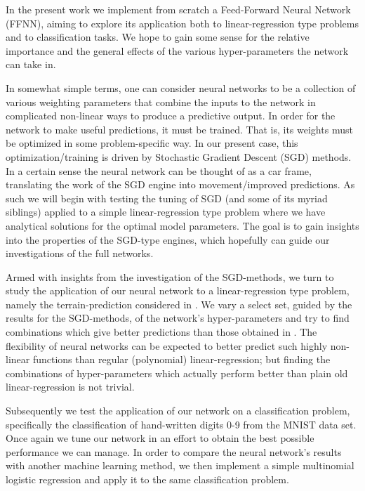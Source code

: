 \documentclass[reprint, english, nofootinbib]{revtex4-2}
\begin{document}
In the present work we implement from scratch a Feed-Forward Neural Network (FFNN), aiming to explore its application both to linear-regression type problems and to classification tasks. We hope to gain some sense for the relative importance and the general effects of the various hyper-parameters the network can take in.

In somewhat simple terms, one can consider neural networks to be a collection of various weighting parameters that combine the inputs to the network in complicated non-linear ways to produce a predictive output. In order for the network to make useful predictions, it must be trained. That is, its weights must be optimized in some problem-specific way. In our present case, this optimization/training is driven by Stochastic Gradient Descent (SGD) methods. In a certain sense the neural network can be thought of as a car frame, translating the work of the SGD engine into movement/improved predictions. As such we will begin with testing the tuning of SGD (and some of its myriad siblings) applied to a simple linear-regression type problem where we have analytical solutions for the optimal model parameters. The goal is to gain insights into the properties of the SGD-type engines, which hopefully can guide our investigations of the full networks.

Armed with insights from the investigation of the SGD-methods, we turn to study the application of our neural network to a linear-regression type problem, namely the terrain-prediction considered in \cite{4155_project_1}. We vary a select set, guided by the results for the SGD-methods, of the network's hyper-parameters and try to find combinations which give better predictions than those obtained in \cite{4155_project_1}. The flexibility of neural networks can be expected to better predict such highly non-linear functions than regular (polynomial) linear-regression; but finding the combinations of hyper-parameters which actually perform better than plain old linear-regression is not trivial.

Subsequently we test the application of our network on a classification problem, specifically the classification of hand-written digits 0-9 from the MNIST data set. Once again we tune our network in an effort to obtain the best possible performance we can manage. In order to compare the neural network's results with another machine learning method, we then implement a simple multinomial logistic regression and apply it to the same classification problem.
\end{document}
